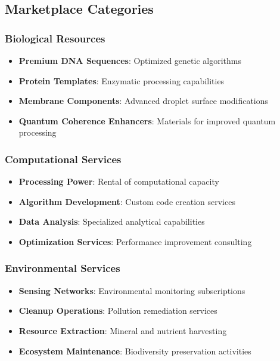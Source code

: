 \documentclass[11pt,a4paper]{article}
\begin{document}
\subsection{Marketplace Categories}

\subsubsection{Biological Resources}
\begin{itemize}
    \item \textbf{Premium DNA Sequences}: Optimized genetic algorithms
    \item \textbf{Protein Templates}: Enzymatic processing capabilities
    \item \textbf{Membrane Components}: Advanced droplet surface modifications
    \item \textbf{Quantum Coherence Enhancers}: Materials for improved quantum processing
\end{itemize}

\subsubsection{Computational Services}
\begin{itemize}
    \item \textbf{Processing Power}: Rental of computational capacity
    \item \textbf{Algorithm Development}: Custom code creation services
    \item \textbf{Data Analysis}: Specialized analytical capabilities
    \item \textbf{Optimization Services}: Performance improvement consulting
\end{itemize}

\subsubsection{Environmental Services}
\begin{itemize}
    \item \textbf{Sensing Networks}: Environmental monitoring subscriptions
    \item \textbf{Cleanup Operations}: Pollution remediation services
    \item \textbf{Resource Extraction}: Mineral and nutrient harvesting
    \item \textbf{Ecosystem Maintenance}: Biodiversity preservation activities
\end{itemize}
\end{document}
